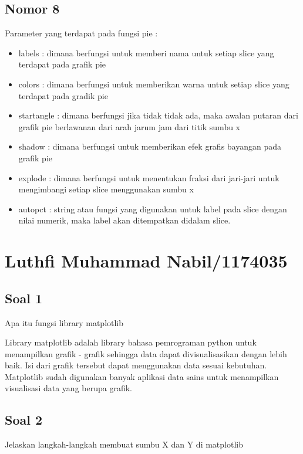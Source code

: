 	\subsection{Nomor 8}
	Parameter yang terdapat pada fungsi pie :
		\begin{itemize}
			\item labels : dimana berfungsi untuk memberi nama untuk setiap slice yang terdapat pada grafik pie
			\item colors : dimana berfungsi untuk memberikan warna untuk setiap slice yang terdapat pada gradik pie
			\item startangle : dimana berfungsi jika tidak tidak ada, maka awalan putaran dari grafik pie berlawanan dari arah jarum jam dari titik sumbu x
			\item shadow : dimana berfungsi untuk memberikan efek grafis bayangan pada grafik pie
			\item explode : dimana berfungsi untuk menentukan fraksi dari jari-jari untuk mengimbangi setiap slice menggunakan sumbu x
			\item autopct : string atau fungsi yang digunakan untuk label pada slice dengan nilai numerik, maka label akan ditempatkan didalam slice.			
		\end{itemize}

\section{Luthfi Muhammad Nabil/1174035}
\subsection{Soal 1}
Apa itu fungsi library matplotlib

Library matplotlib adalah library bahasa pemrograman python untuk menampilkan grafik - grafik sehingga data dapat divisualisasikan dengan lebih baik. Isi dari grafik tersebut dapat menggunakan data sesuai kebutuhan. Matplotlib sudah digunakan banyak aplikasi data sains untuk menampilkan visualisasi data yang berupa grafik. 

\subsection{Soal 2}
Jelaskan langkah-langkah membuat sumbu X dan Y di matplotlib

